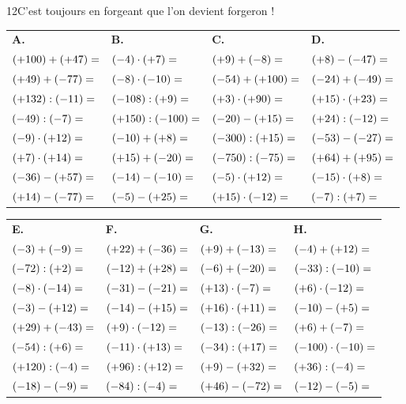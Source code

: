 \begin{exercice}{12}{C'est toujours en forgeant que l'on devient forgeron !}

{\small
\bigskip
\def\arraystretch{1.25}
\begin{tabularx}{\linewidth}{*{4}{X}}
\textbf{A.} & \textbf{B.} & \textbf{C.} & \textbf{D.} \\
$(+100)+(+47)= \dotfill$ & $(-4)\cdot(+7)= \dotfill$    & $(+9)+(-8)= \dotfill$      & $(+8)-(-47)= \dotfill$      \\
$(+49)+(-77)= \dotfill$  & $(-8)\cdot(-10)= \dotfill$   & $(-54)+(+100)= \dotfill$   & $(-24)+(-49)= \dotfill$     \\
$(+132):(-11)= \dotfill$ & $(-108):(+9)= \dotfill$      & $(+3)\cdot(+90)= \dotfill$ & $(+15)\cdot(+23)= \dotfill$ \\
$(-49):(-7)= \dotfill$   & $(+150):(-100)= \dotfill$    & $(-20)-(+15)= \dotfill$    & $(+24):(-12)= \dotfill$     \\
$(-9)\cdot(+12)= \dotfill$ & $(-10)+(+8)= \dotfill$     & $(-300):(+15)= \dotfill$   & $(-53)-(-27)= \dotfill$     \\
$(+7)\cdot(+14)= \dotfill$ & $(+15)+(-20)= \dotfill$    & $(-750):(-75)= \dotfill$   & $(+64)+(+95)= \dotfill$     \\
$(-36)-(+57)= \dotfill$  & $(-14)-(-10)= \dotfill$      & $(-5)\cdot(+12)= \dotfill$ & $(-15)\cdot(+8)= \dotfill$  \\
$(+14)-(-77)= \dotfill$  & $(-5)-(+25)= \dotfill$       & $(+15)\cdot(-12)= \dotfill$& $(-7):(+7)= \dotfill$       \\
\end{tabularx}

\bigskip
\begin{tabularx}{\linewidth}{*{4}{X}}
\textbf{E.} & \textbf{F.} & \textbf{G.} & \textbf{H.} \\
$(-3)+(-9)= \dotfill$    & $(+22)+(-36)= \dotfill$      & $(+9)+(-13)= \dotfill$      & $(-4)+(+12)= \dotfill$       \\
$(-72):(+2)= \dotfill$   & $(-12)+(+28)= \dotfill$      & $(-6)+(-20)= \dotfill$      & $(-33):(-10)= \dotfill$      \\
$(-8)\cdot(-14)= \dotfill$ & $(-31)-(-21)= \dotfill$    & $(+13)\cdot(-7)= \dotfill$  & $(+6)\cdot(-12)= \dotfill$   \\
$(-3)-(+12)= \dotfill$   & $(-14)-(+15)= \dotfill$      & $(+16)\cdot(+11)= \dotfill$ & $(-10)-(+5)= \dotfill$       \\
$(+29)+(-43)= \dotfill$  & $(+9)\cdot(-12)= \dotfill$   & $(-13):(-26)= \dotfill$     & $(+6)+(-7)= \dotfill$        \\
$(-54):(+6)= \dotfill$   & $(-11)\cdot(+13)= \dotfill$  & $(-34):(+17)= \dotfill$     & $(-100)\cdot(-10)= \dotfill$ \\
$(+120):(-4)= \dotfill$  & $(+96):(+12)= \dotfill$      & $(+9)-(+32)= \dotfill$      & $(+36):(-4)= \dotfill$       \\
$(-18)-(-9)= \dotfill$   & $(-84):(-4)= \dotfill$       & $(+46)-(-72)= \dotfill$     & $(-12)-(-5)= \dotfill$       \\
\end{tabularx}

}
\end{exercice}
